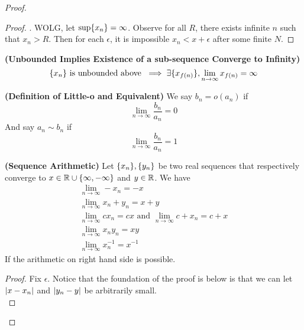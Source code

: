 \documentclass{report}
\begin{document}
\begin{proof}
\begin{proof}
. WOLG, let $\sup \{ x_n \}=\infty$. Observe for all $R$, there exists infinite $n$ such that  $x_n>R$. Then for each $\epsilon $, it is impossible $x_n<x+\epsilon $ after some finite $N$.  \CaC
\end{proof}
\begin{corollary}
\label{2.1.4}
\textbf{(Unbounded Implies Existence of a sub-sequence Converge to Infinity)}
\begin{equation}
\{ x_n \}\text{ is unbounded above }\implies \exists \{ x_{f(n)} \}, \lim_{n\to\infty}x_{f(n)}=\infty
\end{equation}
\end{corollary}
\begin{definition}
\label{2.1.5}
\textbf{(Definition of Little-o and Equivalent)} We say $b_n=o(a_n)$ if
\begin{equation}
\lim_{n\to\infty}\frac{b_n}{a_n}=0
\end{equation}
And say $a_n\sim b_n$ if
\begin{equation}
\lim_{n\to\infty} \frac{b_n}{a_n}=1
\end{equation}
\end{definition}
\begin{theorem}
\label{2.1.6}
\textbf{(Sequence Arithmetic)} Let $\{ x_n \},\{ y_n \}$ be two real sequences that respectively converge to $x\in\mathbb{R}\cup \{ \infty,-\infty \}$ and  $y\in\mathbb{R}$. We have
\begin{gather}
\lim_{n\to\infty} -x_n=-x\\
\lim_{n\to\infty} x_n+y_n= x+y\\
\lim_{n\to\infty} cx_n=cx\text{ and }\lim_{n\to\infty}c+x_n=c+x\\
\lim_{n\to\infty} x_ny_n=xy\\
\lim_{n\to\infty} x_n^{-1}=x^{-1}
\end{gather}
If the arithmetic on right hand side is possible. 
\end{theorem}
\begin{proof}
Fix $\epsilon $. Notice that the foundation of the proof is below is that we can let $\left|x-x_n\right|$ and $\left|y_n-y\right|$ be arbitrarily small.\\


\end{proof}
\end{proof}
\end{document}
